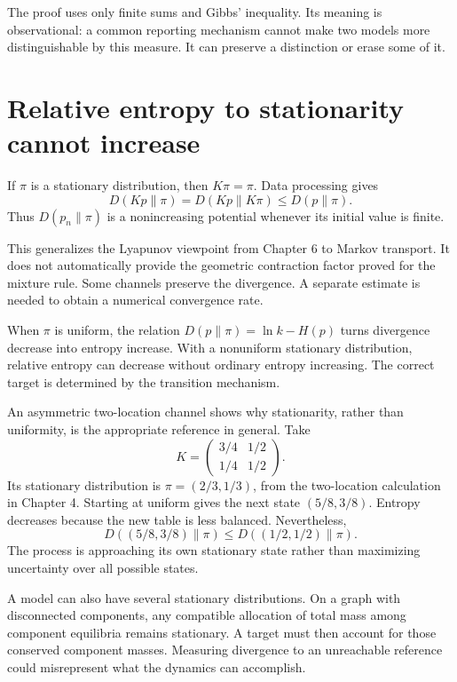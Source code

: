 \documentclass[11pt,oneside,openany]{book}
\theoremstyle{definition}
\theoremstyle{remark}
\numberwithin{equation}{chapter}
\begin{document}
The proof uses only finite sums and Gibbs' inequality. Its meaning is observational: a common reporting mechanism cannot make two models more distinguishable by this measure. It can preserve a distinction or erase some of it.

\section{Relative entropy to stationarity cannot increase}\label{ch10-relative-entropy-to-stationarity-cannot-increase}

If \(\pi\) is a stationary distribution, then \(K\pi=\pi\). Data processing gives \[D(Kp\|\pi)=D(Kp\|K\pi)\leq D(p\|\pi).\] Thus \(D(p_n\|\pi)\) is a nonincreasing potential whenever its initial value is finite.

This generalizes the Lyapunov viewpoint from Chapter 6 to Markov transport. It does not automatically provide the geometric contraction factor proved for the mixture rule. Some channels preserve the divergence. A separate estimate is needed to obtain a numerical convergence rate.

When \(\pi\) is uniform, the relation \(D(p\|\pi)=\ln k-H(p)\) turns divergence decrease into entropy increase. With a nonuniform stationary distribution, relative entropy can decrease without ordinary entropy increasing. The correct target is determined by the transition mechanism.

An asymmetric two-location channel shows why stationarity, rather than uniformity, is the appropriate reference in general. Take \[K=\begin{pmatrix}3/4&1/2\\1/4&1/2\end{pmatrix}.\] Its stationary distribution is \(\pi=(2/3,1/3)\), from the two-location calculation in Chapter 4. Starting at uniform gives the next state \((5/8,3/8)\). Entropy decreases because the new table is less balanced. Nevertheless, \[D((5/8,3/8)\|\pi)\leq D((1/2,1/2)\|\pi).\] The process is approaching its own stationary state rather than maximizing uncertainty over all possible states.

A model can also have several stationary distributions. On a graph with disconnected components, any compatible allocation of total mass among component equilibria remains stationary. A target must then account for those conserved component masses. Measuring divergence to an unreachable reference could misrepresent what the dynamics can accomplish.
\end{document}
